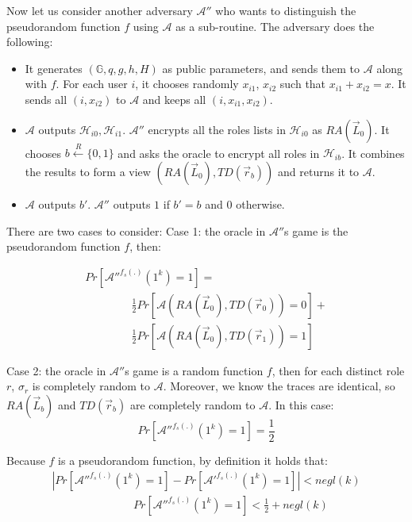 \documentclass[epsfig,a4paper,11pt,titlepage]{book}
\numberwithin{algorithm}{chapter}
\begin{document}
Now let us consider another adversary $\mathcal{A}''$ who wants to distinguish the pseudorandom function $f$ using $\mathcal{A}$ as a sub-routine. The adversary does the following:
\begin{itemize}
\item It generates $(\mathbb{G}, q, g, h, H)$ as public parameters, and sends them to $\mathcal{A}$ along with $f$. For each user $i$, it chooses randomly $x_{i1}$, $x_{i2}$ such that $x_{i1} + x_{i2} = x$. It sends all $(i, x_{i2})$ to $\mathcal{A}$ and keeps all $(i, x_{i1}, x_{i2})$.
\item $\mathcal{A}$ outputs $\mathcal{H}_{i0},\mathcal{H}_{i1}$. $\mathcal{A}''$ encrypts all the roles lists in $\mathcal{H}_{i0}$ as $RA(\vec{L}_0)$. It chooses $b \xleftarrow{R} \{0,1\}$ and asks the oracle to encrypt all roles in $\mathcal{H}_{ib}$. It combines the results to form a view $(RA(\vec{L}_0),TD(\vec{r}_b))$ and returns it to $\mathcal{A}$.
\item $\mathcal{A}$ outputs $b'$. $\mathcal{A}''$ outputs $1$ if $b'=b$ and $0$ otherwise.
\end{itemize}

There are two cases to consider:
Case 1: the oracle in $\mathcal{A}''$s game is the pseudorandom function $f$, then:

\begin{equation}
\begin{array}{l}
Pr[\mathcal{A}''^{f_{s}(.)}(1^k) = 1] = \\
\hspace{50pt} \frac{1}{2} Pr[\mathcal{A}(RA(\vec{L}_0), TD(\vec{r}_0)) = 0] + \\
\hspace{50pt} \frac{1}{2} Pr[\mathcal{A}(RA(\vec{L}_0), TD(\vec{r}_1)) = 1]
\end{array}
\end{equation}

Case 2: the oracle in $\mathcal{A}''$s game is a random function $f$, then for each distinct
role $r$, $\sigma_r$ is completely random to $\mathcal{A}$. Moreover, we know the traces are identical, so $RA(\vec{L}_b)$ and $TD(\vec{r}_b)$ are completely random to $\mathcal{A}$. In this case:
\begin{equation}
Pr[\mathcal{A}''^{f_{s}(.)}(1^k) = 1] = \frac{1}{2}
\end{equation}

Because $f$ is a pseudorandom function, by definition it holds that:
\begin{equation}
\begin{array}{l}
|Pr[\mathcal{A}''^{f_{s}(.)}(1^k) = 1] - Pr[\mathcal{A}'^{f_{s}(.)}(1^k) = 1]| < negl(k)\\
\hspace{88pt} Pr[\mathcal{A}''^{f_{s}(.)}(1^k) = 1] < \frac{1}{2} + negl(k)
\end{array}
\end{equation}
\end{document}
